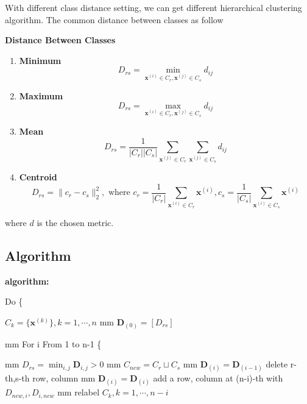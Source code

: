 With different class distance setting, we can get different hierarchical clustering algorithm. The common distance between classes as follow

\noindent \textbf{Distance Between Classes}
\begin{enumerate}
	\item \textbf{Minimum}
	\[
		D_{rs} = \min_{\boldsymbol x ^{(i)} \in C_r,\boldsymbol x ^{(j)} \in C_s} d_{ij}
	\]
	\item \textbf{Maximum}
	\[
		D_{rs} = \max_{\boldsymbol x ^{(i)} \in C_r,\boldsymbol x ^{(j)} \in C_s} d_{ij}
	\]
	\item \textbf{Mean}
	\[
		D_{rs} = \frac{1}{|C_r||C_s|}\sum_{\boldsymbol x ^{(j)} \in C_r}\sum_{\boldsymbol x ^{(j)} \in C_s}d_{ij}
	\]
	\item \textbf{Centroid}
	\[
		D_{rs} = \|c_{r}-c_{s}\|_2^2, \text{ where } c_{r} = \frac{1}{|C_r|}\sum_{\boldsymbol x ^{(i)}\in C_r}\boldsymbol x ^{(i)}, c_{s} = \frac{1}{|C_s|}\sum_{\boldsymbol x ^{(i)}\in C_s}\boldsymbol x ^{(i)}
	\]
\end{enumerate}
where $d$ is the chosen metric.

















\subsection{Algorithm}

\noindent \textbf{algorithm:}

Do \{

	\qquad $C_k = \{\boldsymbol x^{(k)}\}, k = 1,\cdots,n$
	 mm
    \qquad $\mathbf{D}_{(0)} = [D_{rs}]$

	 mm
	\qquad For i From 1 to n-1 \{

		 mm
		\qquad \qquad $D_{rs} = \min_{i,j} \mathbf{D}_{i,j}>0$
		 mm
		\qquad \qquad $C_{new} = C_r \sqcup C_s$
		 mm
		\qquad \qquad $\mathbf{D}_{(i)} = \mathbf{D}_{(i-1)}$ delete r-th,s-th row, column
		 mm
		\qquad \qquad $\mathbf{D}_{(i)} = \mathbf{D}_{(i)}$ add a row, column at (n-i)-th with $D_{new,i},D_{i,new}$
		 mm
		\qquad \qquad relabel $C_k, k = 1,\cdots,n-i$ 	

